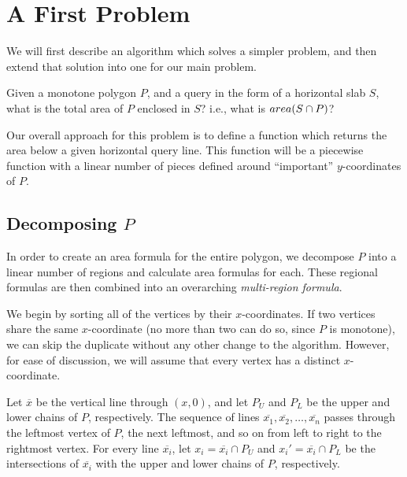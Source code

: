 \section{A First Problem}
\label{:monotonep:approach}

We will first describe an algorithm which solves a simpler problem, and then extend that solution into one for our main problem.

\begin{problem}
Given a monotone polygon $P$, and a query in the form of a horizontal slab $S$, what is the total area of $P$ enclosed in $S$?  i.e., what is $area(S \cap P)$?
\end{problem}

Our overall approach for this problem is to define a function which returns the area below a given horizontal query line. This function will be a piecewise function with a linear number of pieces defined around ``important'' $y$-coordinates of $P$.


\subsection{Decomposing $P$}
\label{sec:decompose}

In order to create an area formula for the entire polygon, we decompose $P$ into a linear number of regions and calculate area formulas for each. These regional formulas are then combined into an overarching \emph{multi-region formula}.

We begin by sorting all of the vertices by their $x$-coordinates. If two vertices share the same $x$-coordinate (no more than two can do so, since $P$ is monotone), we can skip the duplicate without any other change to the algorithm. However, for ease of discussion, we will assume that every vertex has a distinct $x$-coordinate.

Let $\overline{x}$ be the vertical line through $(x,0)$, and let $P_U$ and $P_L$ be the upper and lower chains of $P$, respectively. The sequence of lines $\overline{x_1}, \overline{x_2}, \ldots, \overline{x_n}$ passes through the leftmost vertex of $P$, the next leftmost, and so on from left to right to the rightmost vertex.  For every line $\overline{x_i}$, let $x_i = \overline{x_i} \cap P_U$ and $x_i' = \overline{x_i} \cap P_L$ be the intersections of $\overline{x_i}$ with the upper and lower chains of $P$, respectively.

